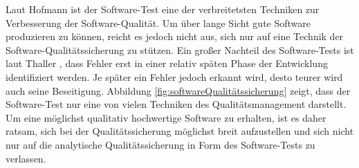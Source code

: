 Laut Hofmann \cite[vgl. S.22]{hoffmann_software-qualitat_2013} ist der Software-Test eine der verbreitetsten Techniken zur Verbesserung der Software-Qualität. Um über lange Sicht gute Software produzieren zu können, reicht es jedoch nicht aus, sich nur auf eine Technik der Software-Qualitätssicherung zu stützen. Ein großer Nachteil des Software-Tests ist laut Thaller \cite[vgl. S.18]{thaller_software-test_2002}, dass Fehler erst in einer relativ späten Phase der Entwicklung identifiziert werden. Je später ein Fehler jedoch erkannt wird, desto teurer wird auch seine Beseitigung. Abbildung \ref{fig:softwareQualitätssicherung} zeigt, dass der Software-Test nur eine von vielen Techniken des Qualitätsmanagement darstellt. Um eine möglichst qualitativ hochwertige Software zu erhalten, ist es daher ratsam, sich bei der Qualitätssicherung möglichst breit aufzustellen und sich nicht nur auf die analytische Qualitätssicherung in Form des Software-Tests zu verlassen. 


